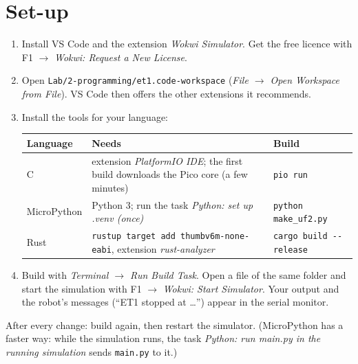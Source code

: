\documentclass[a4paper,11pt]{article}
\newcounter{task}
\newcommand{\code}[1]{\texttt{#1}}
\begin{document}
\section{Set-up}
\begin{enumerate}
  \item Install VS Code and the extension \emph{Wokwi Simulator}. Get the free licence with F1 $\rightarrow$
        \emph{Wokwi: Request a New License}.
  \item Open \code{Lab/2-programming/et1.code-workspace} (\emph{File $\rightarrow$ Open Workspace from File}).
        VS Code then offers the other extensions it recommends.
  \item Install the tools for your language:\\[1mm]
        {\small\renewcommand{\arraystretch}{1.2}%
        \begin{tabularx}{\linewidth}{@{}lXl@{}}
          \toprule
          \sffamily Language & \sffamily Needs & \sffamily Build \\
          \midrule
          C & extension \emph{PlatformIO IDE}; the first build downloads the Pico core (a few minutes) & \code{pio run} \\
          MicroPython & Python 3; run the task \emph{Python: set up .venv (once)} & \code{python make\_uf2.py} \\
          Rust & \code{rustup target add thumbv6m-none-eabi}, extension \emph{rust-analyzer} & \code{cargo build -{}-release} \\
          \bottomrule
        \end{tabularx}}
  \item Build with \emph{Terminal $\rightarrow$ Run Build Task}. Open a file of the same folder and start the
        simulation with F1 $\rightarrow$ \emph{Wokwi: Start Simulator}. Your output and the robot's messages
        (``ET1 stopped at \dots'') appear in the serial monitor.
\end{enumerate}
After every change: build again, then restart the simulator. (MicroPython has a faster way: while the
simulation runs, the task \emph{Python: run main.py in the running simulation} sends \code{main.py} to it.)
\end{document}
